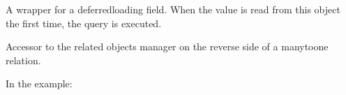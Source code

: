 \documentclass[letterpaper,10pt,french]{sphinxmanual}
\begin{document}
\begin{fulllineitems}

\begin{fulllineitems}
\label{\detokenize{main/model:main.models.Ue.TYPES_NIVEAU}}
\pysigstartsignatures
{}
\pysigstopsignatures
\end{fulllineitems}


\begin{fulllineitems}
\label{\detokenize{main/model:main.models.Ue.codeUE}}
\pysigstartsignatures
{}
\pysigstopsignatures
\sphinxAtStartPar
A wrapper for a deferred\sphinxhyphen{}loading field. When the value is read from this
object the first time, the query is executed.

\end{fulllineitems}


\begin{fulllineitems}
\label{\detokenize{main/model:main.models.Ue.competence_set}}
\pysigstartsignatures
{}
\pysigstopsignatures
\sphinxAtStartPar
Accessor to the related objects manager on the reverse side of a
many\sphinxhyphen{}to\sphinxhyphen{}one relation.

\sphinxAtStartPar
In the example:

\begin{sphinxVerbatim}[commandchars=\\\{\}]
 
       
\end{sphinxVerbatim}


\end{fulllineitems}
\end{fulllineitems}
\end{document}
